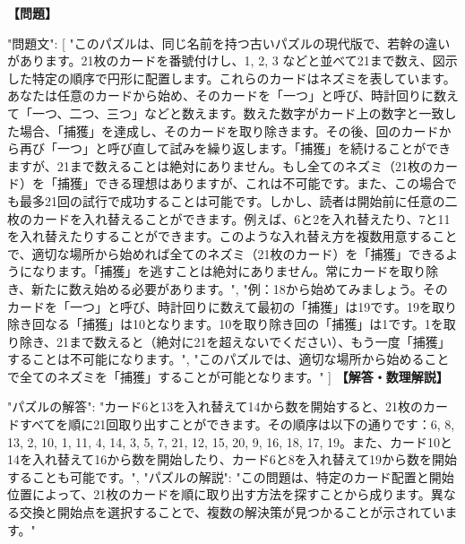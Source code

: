 \documentclass[10pt,a4paper,oneside,openany]{ltjsbook}
\begin{document}
\begin{tcolorbox}[colback=softblue,colframe=primaryblue,title=\textbf{第 274 問：THE MOUSE-TRAP PUZZLE.},arc=2mm,boxrule=1pt,breakable]
\textbf{【問題】}\par\vspace{0.3em}
{
  "問題文": [
    "このパズルは、同じ名前を持つ古いパズルの現代版で、若幹の違いがあります。21枚のカードを番號付けし、1, 2, 3 などと並べて21まで数え、図示した特定の順序で円形に配置します。これらのカードはネズミを表しています。あなたは任意のカードから始め、そのカードを「一つ」と呼び、時計回りに数えて「一つ、二つ、三つ」などと数えます。数えた数字がカード上の数字と一致した場合、「捕獲」を達成し、そのカードを取り除きます。その後、回のカードから再び「一つ」と呼び直して試みを繰り返します。「捕獲」を続けることができますが、21まで数えることは絶対にありません。もし全てのネズミ（21枚のカード）を「捕獲」できる理想はありますが、これは不可能です。また、この場合でも最多21回の試行で成功することは可能です。しかし、読者は開始前に任意の二枚のカードを入れ替えることができます。例えば、6と2を入れ替えたり、7と11を入れ替えたりすることができます。このような入れ替え方を複数用意することで、適切な場所から始めれば全てのネズミ（21枚のカード）を「捕獲」できるようになります。「捕獲」を逃すことは絶対にありません。常にカードを取り除き、新たに数え始める必要があります。",
    "例：18から始めてみましょう。そのカードを「一つ」と呼び、時計回りに数えて最初の「捕獲」は19です。19を取り除き回なる「捕獲」は10となります。10を取り除き回の「捕獲」は1です。1を取り除き、21まで数えると（絶対に21を超えないでください）、もう一度「捕獲」することは不可能になります。",
    "このパズルでは、適切な場所から始めることで全てのネズミを「捕獲」することが可能となります。"
  ]
}
\tcblower
\textbf{【解答・数理解説】}\par\vspace{0.3em}
{
"パズルの解答": "カード6と13を入れ替えて14から数を開始すると、21枚のカードすべてを順に21回取り出すことができます。その順序は以下の通りです：6, 8, 13, 2, 10, 1, 11, 4, 14, 3, 5, 7, 21, 12, 15, 20, 9, 16, 18, 17, 19。また、カード10と14を入れ替えて16から数を開始したり、カード6と8を入れ替えて19から数を開始することも可能です。",
"パズルの解説": "この問題は、特定のカード配置と開始位置によって、21枚のカードを順に取り出す方法を探すことから成ります。異なる交換と開始点を選択することで、複数の解決策が見つかることが示されています。"
}
\end{tcolorbox}
\end{document}
